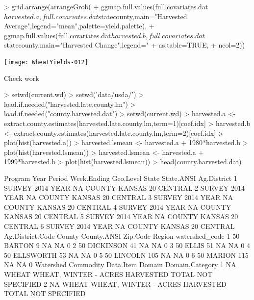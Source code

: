 \documentclass{report}
\begin{document}
\begin{Schunk}
\begin{Sinput}
> grid.arrange(arrangeGrob(
+   ggmap.full.values(full.covariates.dat$harvested.a,full.covariates.dat$statecounty,main="Harvested Average",legend="mean",palette=yield.palette),
+   ggmap.full.values(full.covariates.dat$harvested.b,full.covariates.dat$statecounty,main="Harvested Change",legend="%
+    as.table=TRUE,
+    ncol=2))
\end{Sinput}
\end{Schunk}
\texttt{[image: WheatYields-012]}

Check work
\begin{Schunk}
\begin{Sinput}
> setwd(current.wd)
> setwd('data/usda/')
> load.if.needed("harvested.late.county.lm")
> load.if.needed("county.harvested.dat")
> setwd(current.wd)
> harvested.a <- extract.county.estimates(harvested.late.county.lm,term=1)[coef.idx]
> harvested.b <- extract.county.estimates(harvested.late.county.lm,term=2)[coef.idx]
> plot(hist(harvested.a))
> harvested.lsmean <- harvested.a + 1980*harvested.b
> plot(hist(harvested.lsmean))
> harvested.lsmean <- harvested.a + 1999*harvested.b
> plot(hist(harvested.lsmean))
> head(county.harvested.dat)
\end{Sinput}
\begin{Soutput}
  Program Year Period Week.Ending Geo.Level  State State.ANSI Ag.District
1  SURVEY 2014   YEAR          NA    COUNTY KANSAS         20     CENTRAL
2  SURVEY 2014   YEAR          NA    COUNTY KANSAS         20     CENTRAL
3  SURVEY 2014   YEAR          NA    COUNTY KANSAS         20     CENTRAL
4  SURVEY 2014   YEAR          NA    COUNTY KANSAS         20     CENTRAL
5  SURVEY 2014   YEAR          NA    COUNTY KANSAS         20     CENTRAL
6  SURVEY 2014   YEAR          NA    COUNTY KANSAS         20     CENTRAL
  Ag.District.Code    County County.ANSI Zip.Code Region watershed_code
1               50    BARTON           9       NA     NA              0
2               50 DICKINSON          41       NA     NA              0
3               50     ELLIS          51       NA     NA              0
4               50 ELLSWORTH          53       NA     NA              0
5               50   LINCOLN         105       NA     NA              0
6               50    MARION         115       NA     NA              0
  Watershed Commodity                       Data.Item Domain Domain.Category
1        NA     WHEAT WHEAT, WINTER - ACRES HARVESTED  TOTAL   NOT SPECIFIED
2        NA     WHEAT WHEAT, WINTER - ACRES HARVESTED  TOTAL   NOT SPECIFIED

\end{Soutput}
\end{Schunk}
\end{document}
